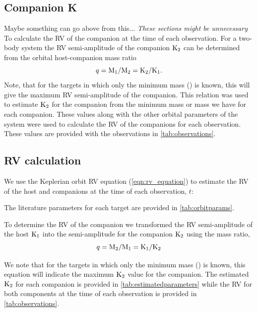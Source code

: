 \subsection{Companion K}  Maybe something can go above from this...
\label{sec:companion_RV}
\emph{These sections might be unnecessary}\\

To calculate the {RV} of the companion at the time of each observation.
For a two-body system the {RV} semi-amplitude of the companion \(\textrm{K}_{2}\) can be determined from the orbital host-companion mass ratio
\begin{equation}
q = \textrm{M}_{1}/\textrm{M}_{2} = \textrm{K}_{2}/\textrm{K}_{1}\label{eqn:q_ratio_K2}.
\end{equation}
Note, that for the targets in which only the minimum mass (\Mtwosini) is known, this will give the maximum {RV} semi-amplitude of the companion.
This relation was used to estimate \(\textrm{K}_{2}\) for the companion from the minimum mass or mass we have for each companion.
These values along with the other orbital parameters of the system were used to calculate the {RV} of the companions for each observation.
These values are provided with the observations in \cref{tab:observations}.




\subsection{{RV} calculation}
We use the Keplerian orbit {RV} equation (\cref{eqn:rv_equation}) to estimate the {RV} of the host and companions at the time of each observation, \(t\):

The literature parameters for each target are provided in \cref{tab:orbitparams}.


To determine the {RV} of the companion we transformed the {RV} semi-amplitude of the host \(\textrm{K}_{1}\) into the semi-amplitude for the companion \(\textrm{K}_{2}\) using the mass ratio,
\begin{equation}
\label{eqn:mass_ratio}
q = \textrm{M}_{2} / \textrm{M}_{1} = \textrm{K}_{1} / \textrm{K}_{2}
\end{equation}

We note that for the targets in which only the minimum mass (\Mtwosini) is known, this equation will indicate the maximum \(\textrm{K}_{2}\) value for the companion.
The estimated \(\textrm{K}_{2}\) for each companion is provided in \cref{tab:estimatedparameters} while the {RV} for both components at the time of each observation is provided in \cref{tab:observations}.


